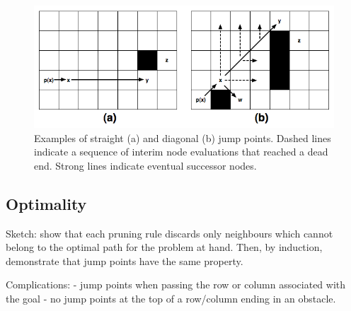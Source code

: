 

\begin{figure}[tb]
       \begin{center}
		   \includegraphics[scale=0.35, trim = 10mm 10mm 10mm 0mm]
			{diagrams/jumppoints.png}
       \end{center}
	\vspace{-3pt}
       \caption{Examples of straight (a) and diagonal (b) jump points.
Dashed lines indicate a sequence of interim node evaluations that reached
a dead end. Strong lines indicate eventual successor nodes.}
       \label{fig:jumppoints}
\end{figure}

\subsection{Optimality}

Sketch: show that each pruning rule discards only neighbours
which cannot belong to the optimal path for the problem at hand.
Then, by induction, demonstrate that jump points have the same 
property. 

Complications:
 - jump points when passing the row or column associated with the goal
 - no jump points at the top of a row/column ending in an obstacle.

